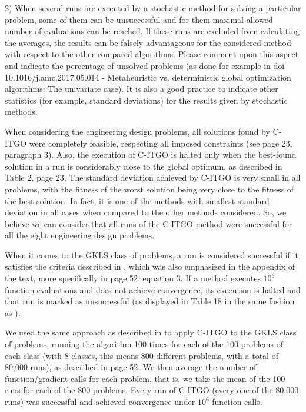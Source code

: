 \begin{revAns}{2) When several runs are executed by a stochastic method for solving a particular problem, some of them can be unsuccessful and for them maximal allowed number of evaluations can be reached. If these runs are excluded from calculating the averages, the results can be falsely advantageous for the considered method with respect to the other compared algorithms. Please comment upon this aspect and indicate the percentage of unsolved problems (as done for example in doi 10.1016/j.amc.2017.05.014 - Metaheuristic vs. deterministic global optimization algorithms: The univariate case). It is also a good practice to indicate other statistics (for example, standard deviations) for the results given by stochastic methods.}

When considering the engineering design problems, all solutions found by C-ITGO were completely feasible, respecting all imposed constraints (see page 23, paragraph 3). Also, the execution of C-ITGO is halted only when the best-found solution in a run is considerably close to the global optimum, as described in Table 2, page 23. The standard deviation achieved by C-ITGO is very small in all problems, with the fitness of the worst solution being very close to the fitness of the best solution. In fact, it is one of the methods with smallest standard deviation in all cases when compared to the other methods considered. So, we believe we can consider that all runs of the C-ITGO method were successful for all the eight engineering design problems.

When it comes to the GKLS class of problems, a run is considered successful if it satisfies the criteria described in \cite{ADC2}, which was also emphasized in the appendix of the text, more specifically in page 52, equation 3. If a method executes $10^6$ function evaluations and does not achieve convergence, its execution is halted and that run is marked as unsuccessful (as displayed in Table 18 in the same fashion as \cite{NAT}).

We used the same approach as described in \cite{NAT} to apply C-ITGO to the GKLS class of problems, running the algorithm 100 times for each of the 100 problems of each class (with 8 classes, this means 800 different problems, with a total of 80,000 runs), as described in page 52. We then average the number of function/gradient calls for each problem, that is, we take the mean of the 100 runs for each of the 800 problems. Every run of C-ITGO (every one of the 80,000 runs) was successful and achieved convergence under $10^6$ function calls.


\end{revAns}
